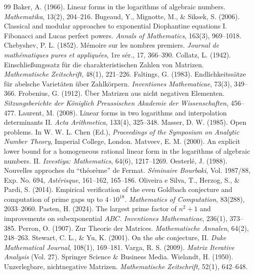 \documentclass[11pt,a4paper]{article}
\theoremstyle{definition}
\begin{document}
\begin{thebibliography}{99}
 Baker, A. (1966). Linear forms in the logarithms of algebraic numbers. \textit{Mathematika}, 13(2), 204--216.
 Bugeaud, Y., Mignotte, M., \& Siksek, S. (2006). Classical and modular approaches to exponential Diophantine equations I. Fibonacci and Lucas perfect powers. \textit{Annals of Mathematics}, 163(3), 969--1018.
 Chebyshev, P. L. (1852). M\'emoire sur les nombres premiers. \textit{Journal de math\'ematiques pures et appliqu\'ees}, 1re s\'er., 17, 366--390.
 Collatz, L. (1942). Einschlie\ss{}ungssatz f\"ur die charakteristischen Zahlen von Matrizen. \textit{Mathematische Zeitschrift}, 48(1), 221--226.
 Faltings, G. (1983). Endlichkeitss\"atze f\"ur abelsche Variet\"aten \"uber Zahlk\"orpern. \textit{Inventiones Mathematicae}, 73(3), 349--366.
 Frobenius, G. (1912). \"Uber Matrizen aus nicht negativen Elementen. \textit{Sitzungsberichte der K\"oniglich Preussischen Akademie der Wissenschaften}, 456--477.
 Laurent, M. (2008). Linear forms in two logarithms and interpolation determinants II. \textit{Acta Arithmetica}, 133(4), 325--348.
 Masser, D. W. (1985). Open problems. In W. W. L. Chen (Ed.), \textit{Proceedings of the Symposium on Analytic Number Theory}, Imperial College, London.
 Matveev, E. M. (2000). An explicit lower bound for a homogeneous rational linear form in the logarithms of algebraic numbers. II. \textit{Izvestiya: Mathematics}, 64(6), 1217--1269.
 Oesterl\'e, J. (1988). Nouvelles approches du ``th\'eor\`eme'' de Fermat. \textit{S\'eminaire Bourbaki}, Vol. 1987/88, Exp. No. 694, \textit{Ast\'erisque}, 161--162, 165--186.
 Oliveira e Silva, T., Herzog, S., \& Pardi, S. (2014). Empirical verification of the even Goldbach conjecture and computation of prime gaps up to $4 \cdot 10^{18}$. \textit{Mathematics of Computation}, 83(288), 2033--2060.
 Pasten, H. (2024). The largest prime factor of $n^2 + 1$ and improvements on subexponential $ABC$. \textit{Inventiones Mathematicae}, 236(1), 373--385.
 Perron, O. (1907). Zur Theorie der Matrices. \textit{Mathematische Annalen}, 64(2), 248--263.
 Stewart, C. L., \& Yu, K. (2001). On the $abc$ conjecture, II. \textit{Duke Mathematical Journal}, 108(1), 169--181.
 Varga, R. S. (2009). \textit{Matrix Iterative Analysis} (Vol. 27). Springer Science \& Business Media.
 Wielandt, H. (1950). Unzerlegbare, nichtnegative Matrizen. \textit{Mathematische Zeitschrift}, 52(1), 642--648.
\end{thebibliography}
\end{document}
